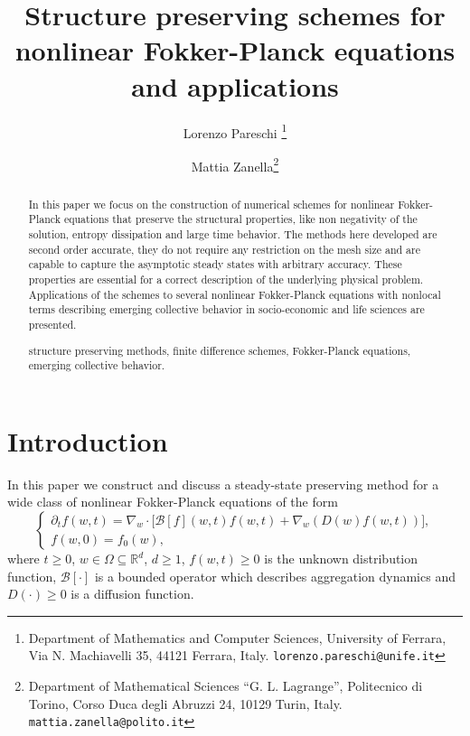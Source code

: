 \documentclass[a4paper]{article}
\theoremstyle{remark}\newtheorem{remark}{Remark}
\newcommand{\RR}{\mathbb{R}}
\newcommand{\B}{\mathcal{B}}
\begin{document}
\title{Structure preserving schemes for nonlinear Fokker-Planck equations and applications}
\author{	Lorenzo Pareschi \thanks{Department of Mathematics and Computer Sciences, University of Ferrara, Via N. Machiavelli 35, 44121 Ferrara, Italy.
			\texttt{lorenzo.pareschi@unife.it}} \and
		Mattia Zanella\thanks{Department of Mathematical Sciences ``G. L. Lagrange'', Politecnico di Torino, Corso Duca degli Abruzzi 24, 10129 Turin, Italy.
			\texttt{mattia.zanella@polito.it}}
		}
\date{}

\maketitle

\begin{abstract}
In this paper we focus on the construction of numerical schemes for nonlinear Fokker-Planck equations that preserve the structural properties, like non negativity of the solution, entropy dissipation and large time behavior. The methods here developed are second order accurate, they do not require any restriction on the mesh size and are capable to capture the asymptotic steady states with arbitrary accuracy. These properties are essential for a correct description of the underlying physical problem. Applications of the schemes to several nonlinear Fokker-Planck equations with nonlocal terms describing emerging collective behavior in socio-economic and life sciences are presented. 

 structure preserving methods, finite difference schemes, Fokker-Planck equations, emerging collective behavior.\\

\end{abstract}

\section{Introduction}

In this paper we construct and discuss a steady-state preserving method for a wide class of nonlinear Fokker-Planck equations of the form 
\begin{equation}\begin{cases}\label{eq:NAD}
\partial_t f(w,t) = \nabla_w \cdot \Big[ \B[f](w,t)f(w,t) + \nabla_w (D(w)f(w,t)) \Big],\\
f(w,0)=f_0(w),
\end{cases}\end{equation}
where $t\ge 0$, $w\in \Omega\subseteq \RR^d$, $d\ge 1$, $f(w,t)\ge 0$ is the unknown distribution function, $\B[\cdot]$ is a bounded operator which describes aggregation dynamics and $D(\cdot)\ge0$ is a diffusion function. 
\end{document}
